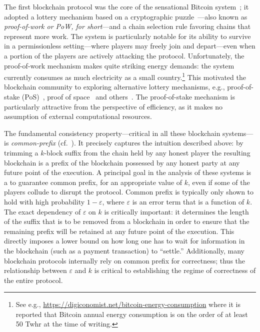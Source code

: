 The first blockchain protocol was the core of the sensational Bitcoin
system~\cite{Nakamoto2008}; it adopted a lottery mechanism based on a
cryptographic puzzle~\cite{C:DwoNao92,hashcash}---also
known as \emph{proof-of-work or PoW, for short}---and a chain
selection rule favoring chains that represent more work. The system is
particularly notable for its ability to survive in a
permissionless setting---where players may freely join and
depart---even when a portion of the players are actively attacking the
protocol. Unfortunately, the proof-of-work mechanism makes quite
striking energy demands: the system currently consumes as much
electricity as a small country.\footnote{See e.g., 
\url{https://digiconomist.net/bitcoin-energy-consumption} where it is reported
that Bitcoin 
annual energy consumption is on the order of at least 50 Twhr at the time of writing. } This motivated the blockchain
community to exploring alternative lottery mechanisms, e.g.,
proof-of-stake
(PoS)~\cite{DBLP:journals/corr/BentovGM14,DBLP:conf/asiacrypt/PassS17,KRDO17},
proof of
space~\cite{C:DFKP15,DBLP:journals/iacr/ParkPAFG15}
and others~\cite{cryptoeprint:2016:035}. The proof-of-stake mechanism
is particularly attractive from the perspective of efficiency, as it
makes no assumption of external computational resources.

The fundamental consistency property---critical in all these
blockchain systems---is \emph{common-prefix}
(cf.~\cite{DBLP:conf/eurocrypt/GarayKL15}). It precisely captures the
intuition described above: by trimming a $k$-block suffix from the
chain held by any honest player the resulting blockchain is a prefix
of the blockchain possessed by any honest party at any future point of
the execution. A principal goal in the analysis of these systems is a
to guarantee common prefix, for an appropriate value of $k$, even if
some of the players collude to disrupt the protocol. Common prefix is
typically only shown to hold with high probability $1-\varepsilon$,
where $\varepsilon$ is an error term that is a function of
$k$. The exact dependency of $\varepsilon$ on $k$ is critically
important: it determines the length of the suffix that is to be
removed from a blockchain in order to ensure that the remaining prefix
will be retained at any future point of the execution. This directly
imposes a lower bound on how long one has to wait for information in
the blockchain (such as a payment transaction) to ``settle.''
Additionally, many blockchain protocols internally rely on common
prefix for correctness; thus the relationship between $\varepsilon$ and
$k$ is critical to establishing the regime of correctness of the
entire protocol.

